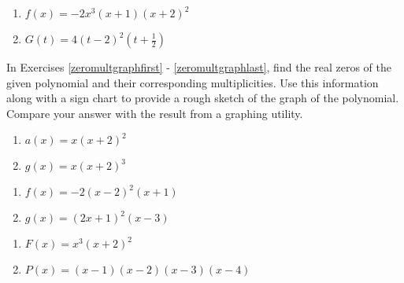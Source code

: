 \documentclass{ximera}
\begin{document}
\begin{multicols}{2}
\begin{enumerate}
\setcounter{enumi}{\value{HW}}

\item $f(x) = -2x^3(x+1)(x+2)^2$
\item $G(t) = 4(t-2)^2\left(t+\frac{1}{2}\right)$ \label{polyfactslast}

\setcounter{HW}{\value{enumi}}
\end{enumerate}
\end{multicols}


\label{polygraphexercise}

In Exercises \ref{zeromultgraphfirst} - \ref{zeromultgraphlast}, find the real zeros of the given polynomial and their corresponding multiplicities.  Use this information along with a sign chart to provide a rough sketch of the graph of the polynomial.  Compare your answer with the result from a graphing utility.

\begin{multicols}{2}
\begin{enumerate}
\setcounter{enumi}{\value{HW}}

\item $a(x) = x(x + 2)^{2}$ \label{zeromultgraphfirst}
\item $g(x) = x(x + 2)^{3}$

\setcounter{HW}{\value{enumi}}
\end{enumerate}
\end{multicols}


\begin{multicols}{2}
\begin{enumerate}
\setcounter{enumi}{\value{HW}}

\item $f(x) = -2(x-2)^2(x+1)$
\item $g(x) = (2x+1)^2(x-3)$

\setcounter{HW}{\value{enumi}}
\end{enumerate}
\end{multicols}


\begin{multicols}{2}
\begin{enumerate}
\setcounter{enumi}{\value{HW}}

\item $F(x) = x^{3}(x + 2)^{2}$
\item $P(x) = (x - 1)(x - 2)(x - 3)(x - 4)$

\setcounter{HW}{\value{enumi}}
\end{enumerate}
\end{multicols}
\end{document}
